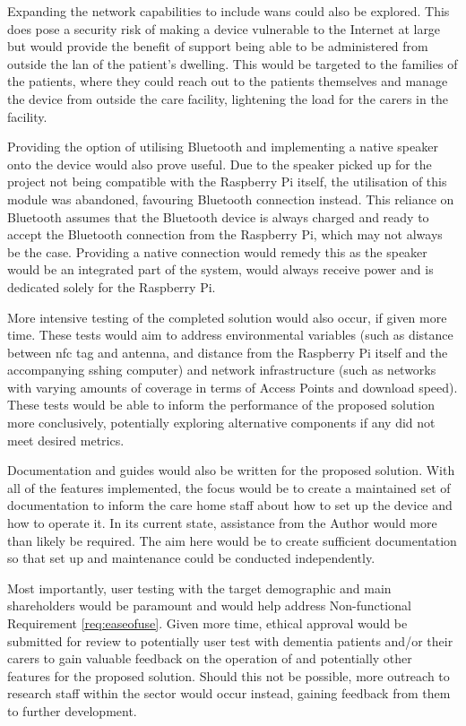 Expanding the network capabilities to include \gls{wan}s could also be explored. This does pose a security risk of making a device vulnerable to the Internet at large but would provide the benefit of support being able to be administered from outside the \gls{lan} of the patient's dwelling. This would be targeted to the families of the patients, where they could reach out to the patients themselves and manage the device from outside the care facility, lightening the load for the carers in the facility.

Providing the option of utilising Bluetooth and implementing a native speaker onto the device would also prove useful. Due to the speaker picked up for the project not being compatible with the Raspberry Pi itself, the utilisation of this module was abandoned, favouring Bluetooth connection instead. This reliance on Bluetooth assumes that the Bluetooth device is always charged and ready to accept the Bluetooth connection from the Raspberry Pi, which may not always be the case. Providing a native connection would remedy this as the speaker would be an integrated part of the system, would always receive power and is dedicated solely for the Raspberry Pi.

More intensive testing of the completed solution would also occur, if given more time. These tests would aim to address environmental variables (such as distance between \gls{nfc} tag and antenna, and distance from the Raspberry Pi itself and the accompanying \gls{ssh}ing computer) and network infrastructure (such as networks with varying amounts of coverage in terms of Access Points and download speed). These tests would be able to inform the performance of the proposed solution more conclusively, potentially exploring alternative components if any did not meet desired metrics.

Documentation and guides would also be written for the proposed solution. With all of the features implemented, the focus would be to create a maintained set of documentation to inform the care home staff about how to set up the device and how to operate it. In its current state, assistance from the Author would more than likely be required. The aim here would be to create sufficient documentation so that set up and maintenance could be conducted independently.

Most importantly, user testing with the target demographic and main shareholders would be paramount and would help address Non-functional Requirement \ref{req:easeofuse}. Given more time, ethical approval would be submitted for review to potentially user test with dementia patients and/or their carers to gain valuable feedback on the operation of and potentially other features for the proposed solution. Should this not be possible, more outreach to research staff within the sector would occur instead, gaining feedback from them to further development.


